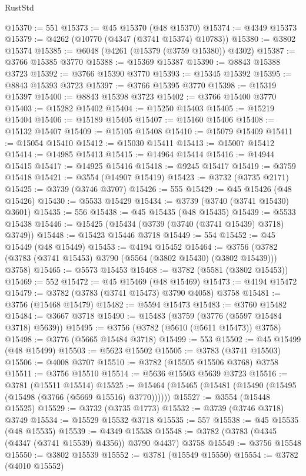 \begin{lexlean}{RustStd}
\begin{coremodule}
@15370 := 551
@15373 := @45 @15370 (@48 @15370)
@15374 := @4349 @15373
@15379 := @4262 (@10770 (@4347 (@3741 @15374) @10783))
@15380 := @3802 @15374
@15385 := @6048 (@4261 (@15379 (@3759 @15380)) @4302)
@15387 := @3766 @15385 @3770
@15388 := @15369 @15387
@15390 := @8843 @15388 @3723
@15392 := @3766 @15390 @3770
@15393 := @15345 @15392
@15395 := @8843 @15393 @3723
@15397 := @3766 @15395 @3770
@15398 := @15319 @15397
@15400 := @8843 @15398 @3723
@15402 := @3766 @15400 @3770
@15403 := @15282 @15402
@15404 := @15250 @15403
@15405 := @15219 @15404
@15406 := @15189 @15405
@15407 := @15160 @15406
@15408 := @15132 @15407
@15409 := @15105 @15408
@15410 := @15079 @15409
@15411 := @15054 @15410
@15412 := @15030 @15411
@15413 := @15007 @15412
@15414 := @14985 @15413
@15415 := @14964 @15414
@15416 := @14944 @15415
@15417 := @14925 @15416
@15418 := @9245 @15417
@15419 := @3759 @15418
@15421 := @3554 (@14907 @15419)
@15423 := @3732 (@3735 @2171)
@15425 := @3739 (@3746 @3707)
@15426 := 555
@15429 := @45 @15426 (@48 @15426)
@15430 := @5533 @15429
@15434 := @3739 (@3740 (@3741 @15430) @3601)
@15435 := 556
@15438 := @45 @15435 (@48 @15435)
@15439 := @5533 @15438
@15446 := @15425 (@15434 (@3739 (@3740 (@3741 @15439) @3718) @3749))
@15448 := @15423 @15446 @3718
@15449 := 554
@15452 := @45 @15449 (@48 @15449)
@15453 := @4194 @15452
@15464 := @3756 (@3782 (@3783 (@3741 @15453) @3790 (@5564 (@3802 @15430) (@3802 @15439))) @3758)
@15465 := @5573 @15453
@15468 := @3782 (@5581 (@3802 @15453))
@15469 := 552
@15472 := @45 @15469 (@48 @15469)
@15473 := @4194 @15472
@15479 := @3782 (@3783 (@3741 @15473) @3790 @4058) @3758
@15481 := @3756 (@15468 @15479)
@15482 := @5594 @15473
@15483 := @3760 @15482
@15484 := @3667 @3718
@15490 := @15483 (@3759 (@3776 (@5597 @15484 @3718) @5639))
@15495 := @3756 (@3782 (@5610 (@5611 @15473)) @3758)
@15498 := @3776 (@5665 @15484 @3718)
@15499 := 553
@15502 := @45 @15499 (@48 @15499)
@15503 := @5623 @15502
@15505 := @3783 (@3741 @15503)
@15506 := @4008 @3707
@15510 := @3782 (@15505 @15506 @3768) @3758
@15511 := @3756 @15510
@15514 := @5636 @15503 @5639 @3723
@15516 := @3781 (@15511 @15514)
@15525 := @15464 (@15465 (@15481 (@15490 (@15495 (@15498 (@3766 (@5669 @15516) @3770))))))
@15527 := @3554 (@15448 @15525)
@15529 := @3732 (@3735 @1773)
@15532 := @3739 (@3746 @3718) @3749
@15534 := @15529 @15532 @3718
@15535 := 557
@15538 := @45 @15535 (@48 @15535)
@15539 := @4349 @15538
@15548 := @3782 (@3783 (@4345 (@4347 (@3741 @15539) @4356)) @3790 @4437) @3758
@15549 := @3756 @15548
@15550 := @3802 @15539
@15552 := @3781 (@15549 @15550)
@15554 := @3782 (@4010 @15552)

\end{coremodule}
\end{lexlean}
